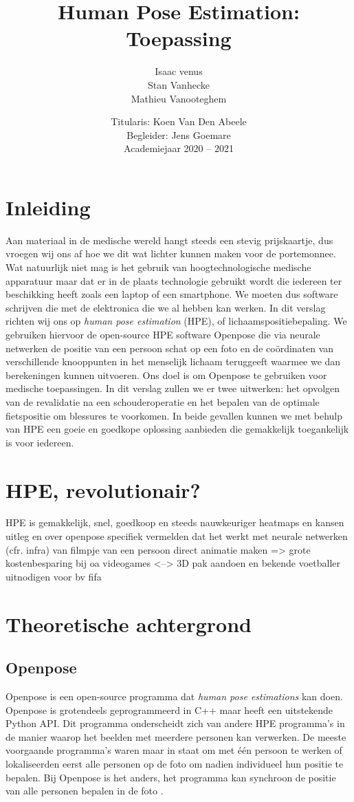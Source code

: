 \documentclass[a4paper,twoside,kulak]{kulakreport}
\title{Human Pose Estimation:\\Toepassing}
\subtitle{}
\author{Isaac venus\\Stan Vanhecke\\Mathieu Vanooteghem}
\institute{KU Leuven Kulak, Wetenschap \& Technologie}
\date{Titularis: Koen Van Den Abeele\\Begleider: Jens Goemare\\Academiejaar 2020 -- 2021}
\begin{document}

\titlepage

\tableofcontents

\chapter*{Inleiding}
Aan materiaal in de medische wereld hangt steeds een stevig prijskaartje, dus vroegen wij ons af hoe we dit wat lichter kunnen maken voor de portemonnee. Wat natuurlijk niet mag is het gebruik van hoogtechnologische medische apparatuur maar dat er in de plaats technologie gebruikt wordt die iedereen ter beschikking heeft zoals een laptop of een smartphone. We moeten dus software schrijven die met de elektronica die we al hebben kan werken. In dit verslag richten wij ons op \emph{human pose estimation} (HPE), of lichaamspositiebepaling. We gebruiken hiervoor de open-source HPE software Openpose die via neurale netwerken de positie van een persoon schat op een foto en de coördinaten van verschillende knooppunten in het menselijk lichaam teruggeeft waarmee we dan berekeningen kunnen uitvoeren. Ons doel is om Openpose te gebruiken voor medische toepassingen. In dit verslag zullen we er twee uitwerken: het opvolgen van de revalidatie na een schouderoperatie en het bepalen van de optimale fietspositie om blessures te voorkomen. In beide gevallen kunnen we met behulp van HPE een goeie en goedkope oplossing aanbieden die gemakkelijk toegankelijk is voor iedereen.

\chapter{HPE, revolutionair?}
HPE is gemakkelijk, snel, goedkoop en steeds nauwkeuriger
heatmaps en kansen uitleg en over openpose specifiek
vermelden dat het werkt met neurale netwerken (cfr. infra)
van filmpje van een persoon direct animatie maken 
=> grote kostenbesparing bij oa videogames <--> 3D pak aandoen en bekende voetballer uitnodigen voor bv fifa

\chapter{Theoretische achtergrond}
\section{Openpose}
Openpose is een open-source programma dat \emph{human pose estimations} kan doen. Openpose is grotendeels geprogrammeerd in C++ maar heeft een uitstekende Python API. Dit programma onderscheidt zich van andere HPE programma's in de manier waarop het beelden met meerdere personen kan verwerken. De meeste voorgaande programma's waren maar in staat om met één persoon te werken of lokaliseerden eerst alle personen op de foto om nadien individueel hun positie te bepalen. Bij Openpose is het anders, het programma kan synchroon de positie van alle personen bepalen in de foto \cite{openpose}.
\end{document}
